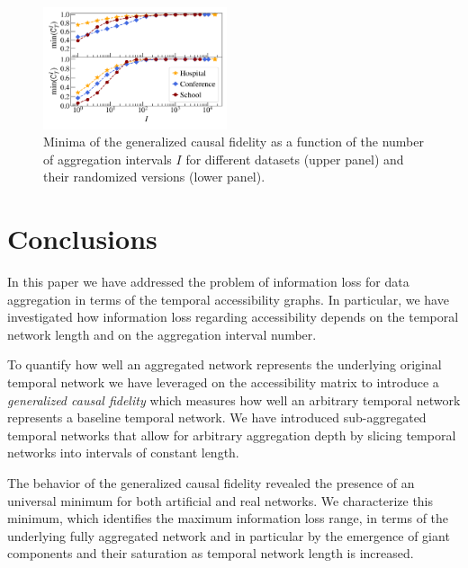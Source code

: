 \documentclass[%
 reprint,
 amsmath,amssymb,
 aps,
]{revtex4-2}
\begin{document}
\begin{figure}[]
\includegraphics[width=0.48\textwidth]{fig/emp_min.png}
\caption{\label{fig:dataMin}
Minima of the generalized causal fidelity as a function of the number of aggregation intervals $I$ for different datasets (upper panel) and their randomized versions (lower panel).
}
\end{figure}


\section{\label{sec:conclusions}Conclusions}
In this paper we have addressed the problem of information loss for data aggregation in terms of the temporal accessibility graphs.
In particular, we have investigated how information loss regarding accessibility depends on the temporal network length and on the aggregation interval number.

To quantify how well an aggregated network represents the underlying original temporal network we have leveraged on the accessibility matrix to introduce a \emph{generalized causal fidelity} which measures how well an arbitrary temporal network represents a baseline temporal network. We have introduced sub-aggregated temporal networks that allow for arbitrary aggregation depth by slicing temporal networks into intervals of constant length.

The behavior of the generalized causal fidelity revealed the presence of an universal minimum for  both artificial and real networks. We characterize this minimum, which identifies the maximum information loss range, in terms of the underlying fully  aggregated network and in particular by the emergence of giant components and their saturation as temporal network length is increased.
\end{document}
